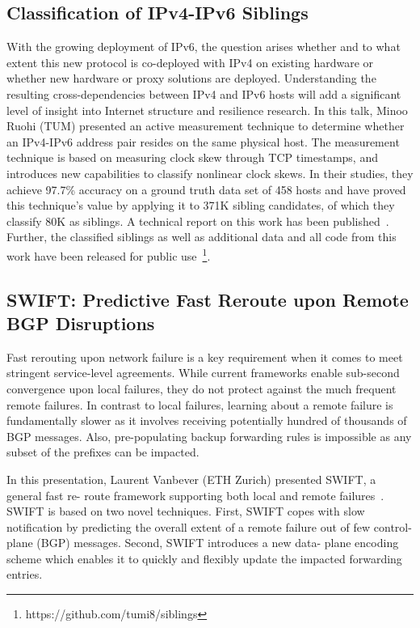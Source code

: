 \subsection{Classification of IPv4-IPv6 Siblings}

With the growing deployment of IPv6, the question arises whether and to what
extent this new protocol is co-deployed with IPv4 on existing hardware or
whether new hardware or proxy solutions are deployed. Understanding the
resulting cross-dependencies between IPv4 and IPv6 hosts will add a
significant level of insight into Internet structure and resilience research.
In this talk, Minoo Ruohi (TUM) presented an active measurement technique to
determine whether an IPv4-IPv6 address pair resides on the same physical host.
The measurement technique is based on measuring clock skew through TCP
timestamps, and introduces new capabilities to classify nonlinear clock skews.
In their studies, they achieve 97.7\% accuracy on a ground truth data set of
458 hosts and have proved this technique's value by applying it to 371K
sibling candidates, of which they classify 80K as siblings. A technical report
on this work has been published~\cite{Scheitle2016}. Further, the classified
siblings as well as additional data and all code from this work have been
released for public use~\footnote{https://github.com/tumi8/siblings}.


\subsection{SWIFT: Predictive Fast Reroute upon Remote BGP Disruptions}

Fast rerouting upon network failure is a key requirement when it comes to meet
stringent service-level agreements. While current frameworks enable sub-second
convergence upon local failures, they do not protect against the much frequent
remote failures. In contrast to local failures, learning about a remote
failure is fundamentally slower as it involves receiving potentially hundred
of thousands of BGP messages. Also, pre-populating backup forwarding rules is
impossible as any subset of the prefixes can be impacted.

In this presentation, Laurent Vanbever (ETH Zurich) presented SWIFT, a general
fast re- route framework supporting both local and remote failures~\cite{}.
SWIFT is based on two novel techniques. First, SWIFT copes with slow
notification by predicting the overall extent of a remote failure out of few
control-plane (BGP) messages. Second, SWIFT introduces a new data- plane
encoding scheme which enables it to quickly and flexibly update the impacted
forwarding entries.

